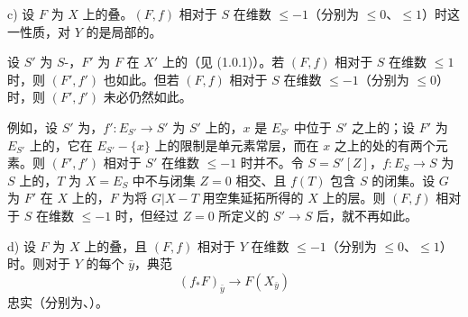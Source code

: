 c) 设 $F$ 为 $X$ 上的叠。$(F,f)$ 相对于 $S$ 在维数 $\leqslant-1$（分别为 $\leqslant0$、$\leqslant1$）时这一性质，对 $Y$ 的是局部的。

设 $S'$ 为 $S$-，$F'$ 为 $F$ 在 $X'$ 上的（见 (1.0.1)）。若 $(F,f)$ 相对于 $S$ 在维数 $\leqslant1$ 时，则 $(F',f')$ 也如此。但若 $(F,f)$ 相对于 $S$ 在维数 $\leqslant-1$（分别为 $\leqslant0$）时，则 $(F',f')$ 未必仍然如此。

例如，设 $S'$ 为，$f':E_{S'}\to S'$ 为 $S'$ 上的，$x$ 是 $E_{S'}$ 中位于 $S'$ 之上的；设 $F'$ 为 $E_{S'}$ 上的，它在 $E_{S'}-\{x\}$ 上的限制是单元素常层，而在 $x$ 之上的处的有两个元素。则 $(F',f')$ 相对于 $S'$ 在维数 $\leqslant-1$ 时并不。令 $S=S'[Z]$，$f:E_S\to S$ 为 $S$ 上的，$T$ 为 $X=E_S$ 中不与闭集 $Z=0$ 相交、且 $f(T)$ 包含 $S$ 的闭集。设 $G$ 为 $F'$ 在 $X$ 上的，$F$ 为将 $G|X-T$ 用空集延拓所得的 $X$ 上的层。则 $(F,f)$ 相对于 $S$ 在维数 $\leqslant-1$ 时，但经过 $Z=0$ 所定义的 $S'\to S$ 后，就不再如此。

d) 设 $F$ 为 $X$ 上的叠，且 $(F,f)$ 相对于 $Y$ 在维数 $\leqslant-1$（分别为 $\leqslant0$、$\leqslant1$）时。则对于 $Y$ 的每个 $\bar y$，典范
\[(f_*F)_{\bar y}\longrightarrow F(X_{\bar y})\]
忠实（分别为、）。

